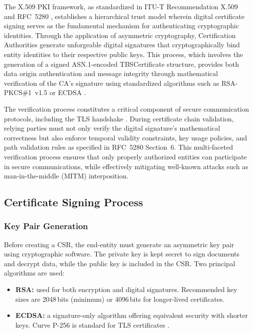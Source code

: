 \documentclass[10pt,twocolumn]{article}
\begin{document}
The X.509 PKI framework, as standardized in ITU-T Recommendation X.509 and
RFC~5280 \cite{rfc5280}, establishes a hierarchical trust model wherein
digital certificate signing serves as the fundamental mechanism for
authenticating cryptographic identities. Through the application of asymmetric
cryptography, Certification Authorities generate unforgeable digital signatures
that cryptographically bind entity identities to their respective public keys.
This process, which involves the generation of a signed ASN.1-encoded
TBSCertificate structure, provides both data origin authentication and message
integrity through mathematical verification of the CA's signature using
standardized algorithms such as RSA-PKCS\#1~v1.5 or ECDSA \cite{rfc5280}.

The verification process constitutes a critical component of secure
communication protocols, including the TLS handshake \cite{rfc8446}. During
certificate chain validation, relying parties must not only verify the digital
signature's mathematical correctness but also enforce temporal validity
constraints, key usage policies, and path validation rules as specified in
RFC~5280 Section~6. This multi-faceted verification process ensures that only
properly authorized entities can participate in secure communications, while
effectively mitigating well-known attacks such as man-in-the-middle (MITM)
interposition.

\subsection{Certificate Signing Process}

\subsubsection{Key Pair Generation}

Before creating a CSR, the end-entity must generate an asymmetric key pair
using cryptographic software. The private key is kept secret to sign documents
and decrypt data, while the public key is included in the CSR. Two principal
algorithms are used:

\begin{itemize}
  \item \textbf{RSA:} used for both encryption and digital signatures.
        Recommended key sizes are 2048\,bits (minimum) or 4096\,bits for
        longer-lived certificates.
  \item \textbf{ECDSA:} a signature-only algorithm offering equivalent security
        with shorter keys. Curve P-256 is standard for TLS certificates
        \cite{rfc5280}.
\end{itemize}
\end{document}
